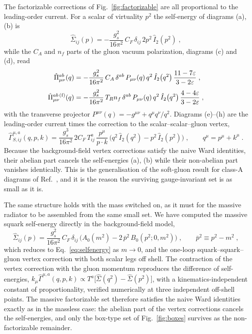 \documentclass[11pt,a4paper]{article}
\newcommand{\eps}{\varepsilon}
\newcommand{\Ihat}{\hat{I}}
\begin{document}
The factorizable corrections of Fig.~\ref{fig:factorizable} are all proportional
to the leading-order current. For a scalar of virtuality $p^2$ the self-energy
of diagrams (a), (b) is
\begin{equation}
  \hat{\Sigma}_{ij}(p)=-\frac{g_s^2}{16\pi^2}\,C_F\,\delta_{ij}\,
  2p^2\,\Ihat_2\!\left(p^2\right)\;,
  \label{eq:selfenergy}
\end{equation}
while the $C_A$ and $n_f$ parts of the gluon vacuum polarization, diagrams (c)
and (d), read
\begin{align}
  \hat{\Pi}^{ab}_{\mu\nu}(q)&=-\frac{g_s^2}{16\pi^2}\,C_A\,\delta^{ab}\,
     P_{\mu\nu}(q)\,q^2\,\Ihat_2\!\left(q^2\right)\frac{11-7\eps}{3-2\eps}\;,
  \label{eq:vacpol-CA}\\[1mm]
  \hat{\Pi}^{ab\,\rm(f)}_{\mu\nu}(q)&=-\frac{g_s^2}{16\pi^2}\,T_R n_f\,\delta^{ab}\,
     P_{\mu\nu}(q)\,q^2\,\Ihat_2\!\left(q^2\right)\frac{4-4\eps}{3-2\eps}\;,
  \label{eq:vacpol-nf}
\end{align}
with the transverse projector $P^{\mu\nu}(q)=-g^{\mu\nu}+q^\mu q^\nu/q^2$.
Diagrams (e)--(h) are the leading-order current times the correction to the
scalar--scalar--gluon vertex,
\begin{equation}
  \hat{\Gamma}^{\mu,a}_{S,ij}(q,p,k)=\frac{g_s^3}{16\pi^2}\,2C_F\,T^a_{ij}\,
  \frac{p^\mu}{p\!\cdot\!k}\,
  \Big(q^2\,\Ihat_2\!\left(q^2\right)-p^2\,\Ihat_2\!\left(p^2\right)\Big)\;,
  \qquad q^\mu=p^\mu+k^\mu\;.
  \label{eq:vertexcorr}
\end{equation}
Because the background-field vertex corrections satisfy
the naive Ward identities, their abelian part cancels the self-energies (a), (b)
while their non-abelian part vanishes identically. This is the generalisation of
the soft-gluon result for class-A diagrams of Ref.~\cite{Catani:2000pi}, and it
is the reason the surviving gauge-invariant set is as small as it is.

The same structure holds with the mass switched on, as it must for the massive
radiator to be assembled from the same small set. We have computed the massive
squark self-energy directly in the background-field model,
\begin{equation}
  \hat{\Sigma}_{ij}(p)=\frac{g_s^2}{16\pi^2}\,C_F\,\delta_{ij}\,
  \Big(A_0(m^2)-2\,\bar p^2\,B_0(p^2;0,m^2)\Big)\;,
  \qquad \bar p^2\equiv p^2-m^2\;,
  \label{eq:selfenergy-massive}
\end{equation}
which reduces to Eq.~\eqref{eq:selfenergy} as $m\to0$, and the one-loop
squark--squark--gluon vertex correction with both scalar legs off shell. The
contraction of the vertex correction with the gluon momentum reproduces the
difference of self-energies,
$k_\mu\hat{\Gamma}^{\mu,a}(q,p,k)\propto T^a\big[\hat\Sigma(q^2)-\hat\Sigma(p^2)\big]$,
with a kinematics-independent constant of proportionality, verified numerically at
three independent off-shell points. The massive factorizable set therefore
satisfies the naive Ward identities exactly as in the massless case: the abelian
part of the vertex corrections cancels the self-energies, and only the box-type
set of Fig.~\ref{fig:boxes} survives as the non-factorizable remainder.
\end{document}
